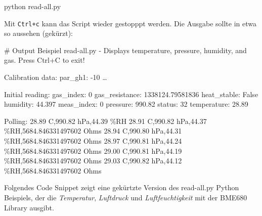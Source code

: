 \documentclass[
  11pt,
  a4paperpaper,
  oneside, openany  ,captions=tableheading
]{scrbook}
\newenvironment{Shaded}{\begin{snugshade}}{\end{snugshade}}
\newcommand{\AttributeTok}[1]{\textcolor[rgb]{0.40,0.45,0.13}{#1}}
\newcommand{\CommentTok}[1]{\textcolor[rgb]{0.37,0.37,0.37}{#1}}
\newcommand{\ExtensionTok}[1]{\textcolor[rgb]{0.00,0.23,0.31}{#1}}
\newcommand{\NormalTok}[1]{\textcolor[rgb]{0.00,0.23,0.31}{#1}}
\theoremstyle{definition}
\theoremstyle{remark}
\begin{document}
\begin{Shaded}
\begin{Highlighting}[]
\ExtensionTok{python}\NormalTok{ read{-}all.py}
\end{Highlighting}
\end{Shaded}

Mit \texttt{Ctrl+c} kann das Script wieder gestopppt werden. Die Ausgabe
sollte in etwa so aussehen (gekürzt):

\begin{Shaded}
\begin{Highlighting}[]
\CommentTok{\# Output Beispiel}
\ExtensionTok{read{-}all.py} \AttributeTok{{-}}\NormalTok{ Displays temperature, pressure, humidity, and gas.}
\ExtensionTok{Press}\NormalTok{ Ctrl+C to exit!}

\ExtensionTok{Calibration}\NormalTok{ data:}
\ExtensionTok{par\_gh1:} \AttributeTok{{-}10}
\ExtensionTok{…}

\ExtensionTok{Initial}\NormalTok{ reading:}
\ExtensionTok{gas\_index:}\NormalTok{ 0}
\ExtensionTok{gas\_resistance:}\NormalTok{ 1338124.79581836}
\ExtensionTok{heat\_stable:}\NormalTok{ False}
\ExtensionTok{humidity:}\NormalTok{ 44.397}
\ExtensionTok{meas\_index:}\NormalTok{ 0}
\ExtensionTok{pressure:}\NormalTok{ 990.82}
\ExtensionTok{status:}\NormalTok{ 32}
\ExtensionTok{temperature:}\NormalTok{ 28.89}

\ExtensionTok{Polling:}
\ExtensionTok{28.89}\NormalTok{ C,990.82 hPa,44.39 \%RH}
\ExtensionTok{28.91}\NormalTok{ C,990.82 hPa,44.37 \%RH,5684.846331497602 Ohms}
\ExtensionTok{28.94}\NormalTok{ C,990.80 hPa,44.31 \%RH,5684.846331497602 Ohms}
\ExtensionTok{28.97}\NormalTok{ C,990.81 hPa,44.24 \%RH,5684.846331497602 Ohms}
\ExtensionTok{29.00}\NormalTok{ C,990.81 hPa,44.19 \%RH,5684.846331497602 Ohms}
\ExtensionTok{29.03}\NormalTok{ C,990.82 hPa,44.12 \%RH,5684.846331497602 Ohms}
\end{Highlighting}
\end{Shaded}

Folgendes Code Snippet zeigt eine gekürtzte Version des read-all.py
Python Beispiels, der die \emph{Temperatur}, \emph{Luftdruck} und
\emph{Luftfeuchtigkeit} mit der BME680 Library ausgibt.
\end{document}
